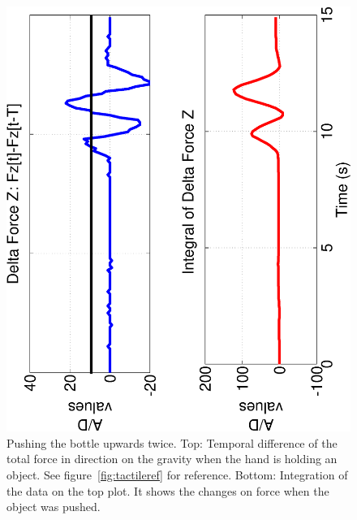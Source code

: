 \begin{figure}[htbp]
\centerline{
\includegraphics[height=\columnwidth, angle=270 ]{./figures/2TapsX.eps}
} \caption[Pushing the bottle upwards twice]{Pushing the bottle
upwards twice. Top: Temporal difference of the total force in
direction on the gravity when the hand is holding an object. See
figure~\ref{fig:tactileref} for reference. Bottom: Integration of
the data on the top plot. It shows the changes on force when the
object was pushed.} \label{fig:twotaps}
\end{figure}









%
%

